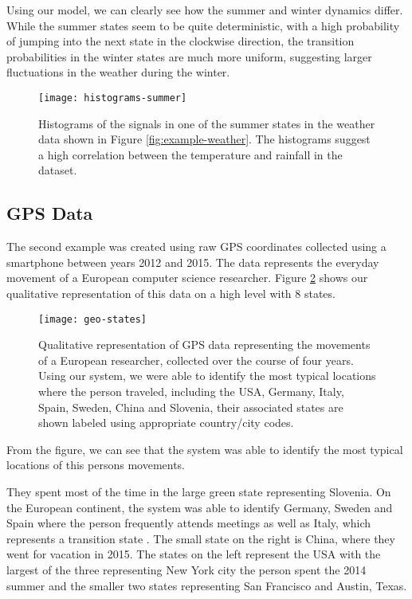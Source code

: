 Using our model, we can clearly see how the summer and winter dynamics differ. While the summer states seem to be quite deterministic, with a high probability of jumping into the next state in the clockwise direction, the transition probabilities in the winter states are much more uniform, suggesting larger fluctuations in the weather during the winter.

\begin{figure}[h!]
	\centering
	\texttt{[image: histograms-summer]}
	\caption{Histograms of the signals in one of the summer states in the weather data shown in Figure \ref{fig:example-weather}. The histograms suggest a high correlation between the temperature and rainfall in the dataset.}
	\label{fig:histograms-summer}
\end{figure}

\subsection{GPS Data}

The second example was created using raw GPS coordinates collected using a smartphone between years 2012 and 2015.
The data represents the everyday movement of a European computer science researcher. Figure \ref{fig:example-geo}
shows our qualitative representation of this data on a high level with 8 states.

\begin{figure}[h!]
	\centering
	\texttt{[image: geo-states]}
	\caption{Qualitative representation of GPS data representing the movements of a European researcher, collected over the course of four years. Using our system, we were able to identify the most typical locations where the person traveled, including the USA, Germany, Italy, Spain, Sweden, China and Slovenia, their associated states are shown labeled using appropriate country/city codes.}
	\label{fig:example-geo}
\end{figure}

From the figure, we can see that the system was able to identify the most typical locations of this persons
movements.

They spent most of the time in the large green state representing Slovenia. On the European continent, the system was able to identify Germany, Sweden and Spain where the person frequently attends meetings as well as Italy, which represents a transition state . The small state on the right is China, where they went for vacation in 2015. The states on the left represent the USA with the largest of the three representing New York city the person spent the 2014 summer and the smaller two states representing San Francisco and Austin, Texas.

